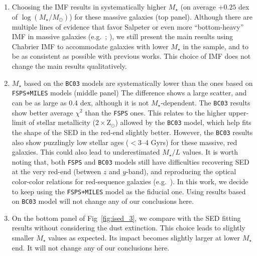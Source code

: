 \documentclass[a4paper,fleqn,usenatbib]{mnras}
\def\mstar{{$M_{\star}$}}
\def\logms{{$\log (M_{\star}/M_{\odot})$}}
\def\m2l{{$M_{\star}/L$}}
\begin{document}
    \begin{enumerate}

        \item Choosing the \citet{Salpeter1955} IMF results in systematically 
            higher \mstar{} (on average $+0.25$ dex of \logms{}) for these massive 
            galaxies (top panel).
            Although there are multiple lines of evidence that favor Salpeter 
            or even more ``bottom-heavy'' IMF in massive galaxies 
            (e.g.\ \citealt{Conroy2012}; \citealt{Cappellari2012}), we still 
            present the main results using Chabrier IMF to accommodate galaxies 
            with lower \mstar{} in the sample, and to be as consistent as possible 
            with previous works.  
            This choice of IMF does not change the main results qualitatively. 

        \item \mstar{} based on the \texttt{BC03} models are systematically lower 
            than the ones based on \texttt{FSPS+MILES} models (middle panel)
            The difference shows a large scatter, and can be as large as 0.4 dex,
            although it is not \mstar{}-dependent. 
            The \texttt{BC03} results show better average ${\chi}^2$ than the 
            \texttt{FSPS} ones. 
            This relates to the higher upper-limit of stellar metallicity 
            ($2 \times \mathrm{Z}_{\odot}$) allowed by the \texttt{BC03} model, 
            which help fits the shape of the SED in the red-end slightly better.  
            However, the \texttt{BC03} results also show puzzlingly low stellar 
            ages ($< 3$--4 Gyrs) for these massive, red galaxies. 
            This could also lead to underestimated \m2l{} values.
            It is worth noting that, both \texttt{FSPS} and \texttt{BC03} 
            models still have difficulties recovering SED at the very red-end 
            (between $z$ and $y$-band), and reproducing the optical color-color 
            relations for red-sequence galaxies (e.g.\ \citealt{MIUSCAT2}).
            In this work, we decide to keep using the \texttt{FSPS+MILES} model as 
            the fiducial one.  
            Using results based on \texttt{BC03} model will not change any of our 
            conclusions here.
            
        \item On the bottom panel of Fig~\ref{fig:ised_3}, we compare with the
            SED fitting results without considering the dust extinction. 
            This choice leads to slightly smaller \mstar{} values as expected. 
            Its impact becomes slightly larger at lower \mstar{} end. 
            It will not change any of our conclusions here.
          
    \end{enumerate}
    
\end{document}
